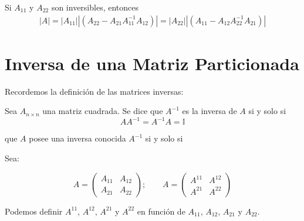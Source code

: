 \documentclass[12pt]{article}
\begin{document}
\begin{center}
\begin{tcolorbox}[colback=blue!10!white ,colframe=white,width=17 cm]
\large \sffamily Si $A_{11}$ y $A_{22}$ son inversibles, entonces
\begin{align*}
    \left | A \right | = \left | A_{11} \right | \left | (A_{22} - A_{21} A_{11}^{-1} A_{12}) \right |= \left | A_{22} \right | \left | (A_{11} - A_{12} A_{22}^{-1} A_{21}) \right |
\end{align*}
\end{tcolorbox}
\end{center}

















\newpage

\section*{Inversa de una Matriz Particionada}

Recordemos la definición de las matrices inversas:

\begin{center}
\begin{tcolorbox}[colback=blue!10!white ,colframe=white,width=12 cm]
 \sffamily  Sea $A_{n \times n}$ una matriz cuadrada. Se dice que $A^{-1}$ es la inversa de $A$ si y solo si
    $$AA^{-1} = A^{-1} A = \mathbb{I}$$
\end{tcolorbox}
\end{center}

que $A$ posee una inversa conocida $A^{-1}$ si y solo si


Sea:

\begin{equation*}
    A = \begin{pmatrix} A_{11} & A_{12}\\ A_{21} & A_{22} \end{pmatrix} ; \qquad A = \begin{pmatrix} A^{11} & A^{12}\\ A^{21} & A^{22} \end{pmatrix} 
\end{equation*}

Podemos definir $A^{11}$, $A^{12}$, $A^{21}$ y $A^{22}$ en función de $A_{11}$, $A_{12}$, $A_{21}$ y $A_{22}$.
\end{document}
